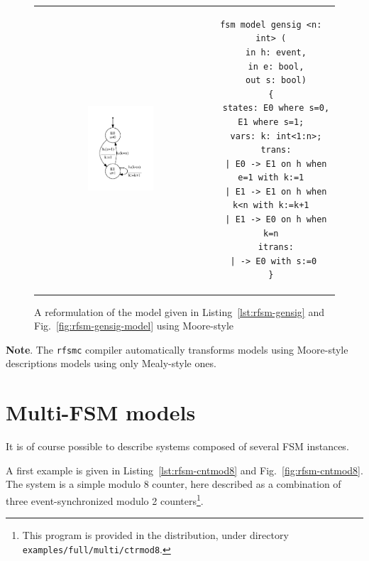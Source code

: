 \begin{figure}[htbp]
  \centering
  \begin{tabular}[c]{cc}
\includegraphics[width=0.4\textwidth]{figs/gensig-model-moore} &
\begin{minipage}[b]{0.6\textwidth}
\begin{lstlisting}[language=Rfsm]
fsm model gensig <n: int> (
  in h: event,
  in e: bool,
  out s: bool)
{
  states: E0 where s=0, E1 where s=1;
  vars: k: int<1:n>;
  trans:
  | E0 -> E1 on h when e=1 with k:=1
  | E1 -> E1 on h when k<n with k:=k+1
  | E1 -> E0 on h when k=n
  itrans:
 | -> E0 with s:=0
}
\end{lstlisting}
\end{minipage}
  \end{tabular}
  \caption{A reformulation of the model given in Listing~\ref{lst:rfsm-gensig} and
    Fig.~\ref{fig:rfsm-gensig-model} using Moore-style}
  \label{fig:rfsm-gensig-moore}
\end{figure}

\medskip \textbf{Note}. The \texttt{rfsmc} compiler automatically transforms models using
Moore-style descriptions models using only Mealy-style ones.


\section*{Multi-FSM models}
\label{sec:multi-fsm-models}

It is of course possible to describe systems composed of several FSM instances.

\medskip
A first example is given in Listing~\ref{lst:rfsm-cntmod8} and Fig.~\ref{fig:rfsm-cntmod8}. The system is a simple modulo 8 counter, here
described as a combination of three event-synchronized modulo 2 counters\footnote{This program is
  provided in the distribution, under directory \texttt{examples/full/multi/ctrmod8}.}.

